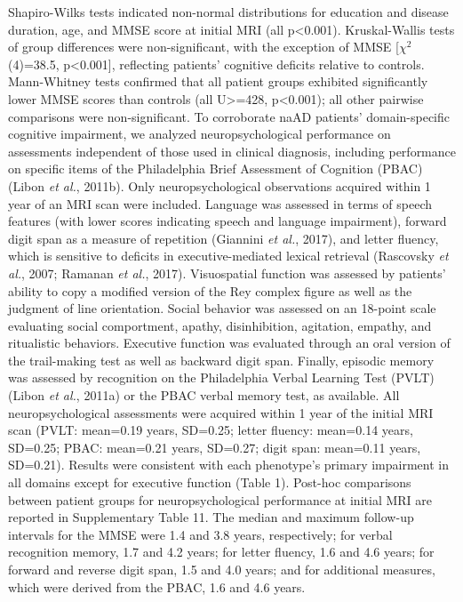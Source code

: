 \documentclass[]{article}
\begin{document}
Shapiro-Wilks tests indicated non-normal distributions for education and
disease duration, age, and MMSE score at initial MRI (all
p\textless{}0.001). Kruskal-Wallis tests of group differences were
non-significant, with the exception of MMSE {[}\(\chi^2\)(4)=38.5,
p\textless{}0.001{]}, reflecting patients' cognitive deficits relative
to controls. Mann-Whitney tests confirmed that all patient groups
exhibited significantly lower MMSE scores than controls (all
U\textgreater{}=428, p\textless{}0.001); all other pairwise comparisons
were non-significant. To corroborate naAD patients' domain-specific
cognitive impairment, we analyzed neuropsychological performance on
assessments independent of those used in clinical diagnosis, including
performance on specific items of the Philadelphia Brief Assessment of
Cognition (PBAC) (Libon \emph{et al.}, 2011b). Only neuropsychological
observations acquired within 1 year of an MRI scan were included.
Language was assessed in terms of speech features (with lower scores
indicating speech and language impairment), forward digit span as a
measure of repetition (Giannini \emph{et al.}, 2017), and letter
fluency, which is sensitive to deficits in executive-mediated lexical
retrieval (Rascovsky \emph{et al.}, 2007; Ramanan \emph{et al.}, 2017).
Visuospatial function was assessed by patients' ability to copy a
modified version of the Rey complex figure as well as the judgment of
line orientation. Social behavior was assessed on an 18-point scale
evaluating social comportment, apathy, disinhibition, agitation,
empathy, and ritualistic behaviors. Executive function was evaluated
through an oral version of the trail-making test as well as backward
digit span. Finally, episodic memory was assessed by recognition on the
Philadelphia Verbal Learning Test (PVLT) (Libon \emph{et al.}, 2011a) or
the PBAC verbal memory test, as available. All neuropsychological
assessments were acquired within 1 year of the initial MRI scan (PVLT:
mean=0.19 years, SD=0.25; letter fluency: mean=0.14 years, SD=0.25;
PBAC: mean=0.21 years, SD=0.27; digit span: mean=0.11 years, SD=0.21).
Results were consistent with each phenotype's primary impairment in all
domains except for executive function (Table 1). Post-hoc comparisons
between patient groups for neuropsychological performance at initial MRI
are reported in Supplementary Table 11. The median and maximum follow-up
intervals for the MMSE were 1.4 and 3.8 years, respectively; for verbal
recognition memory, 1.7 and 4.2 years; for letter fluency, 1.6 and 4.6
years; for forward and reverse digit span, 1.5 and 4.0 years; and for
additional measures, which were derived from the PBAC, 1.6 and 4.6
years.
\end{document}
